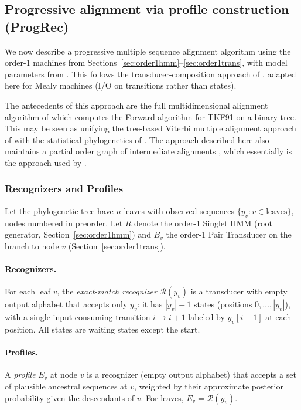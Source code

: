 \subsection{Progressive alignment via profile construction (ProgRec)}
\label{sec:progressive}

We now describe a progressive multiple sequence alignment algorithm
using the order-1 machines from Sections~\ref{sec:order1hmm}--\ref{sec:order1trans},
with model parameters from \cite{LargeHolmes2026}.
This follows the transducer-composition approach of
\cite{WestessonEtAl2012},
adapted here for Mealy machines (I/O on transitions rather than states).

The antecedents of this approach are the full multidimensional alignment algorithm of \cite{Hein2000}
which computes the Forward algorithm for TKF91 on a binary tree.
This may be seen as unifying the tree-based Viterbi multiple alignment approach of \cite{Sankoff85}
with the statistical phylogenetics of \cite{Felsenstein81}.
The approach described here also maintains a partial order graph of 
intermediate alignments \cite{LeeGrassoSharlow2002},
which essentially is the approach used by \cite{LoytynojaGoldman2005}.


\subsubsection{Recognizers and Profiles}

Let the phylogenetic tree have $n$ leaves with observed sequences
$\{y_v : v \in \mbox{leaves}\}$, nodes numbered in preorder.
Let $R$ denote the order-1 Singlet HMM (root generator, Section~\ref{sec:order1hmm})
and $B_v$ the order-1 Pair Transducer on the branch to node $v$ (Section~\ref{sec:order1trans}).

\paragraph{Recognizers.}
For each leaf $v$, the \emph{exact-match recognizer} $\mathcal{R}(y_v)$
is a transducer with empty output alphabet that accepts only $y_v$:
it has $|y_v|+1$ states (positions $0,\ldots,|y_v|$),
with a single input-consuming transition $i \to i+1$ labeled by $y_v[i+1]$ at each position.
All states are waiting states except the start.

\paragraph{Profiles.}
A \emph{profile} $E_v$ at node $v$ is a recognizer (empty output alphabet)
that accepts a set of plausible ancestral sequences at $v$,
weighted by their approximate posterior probability given the descendants of $v$.
For leaves, $E_v = \mathcal{R}(y_v)$.

